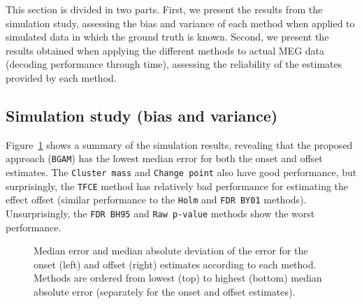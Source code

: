 \documentclass[
  doc,
  floatsintext,
  longtable,
  a4paper,
  nolmodern,
  notxfonts,
  notimes,
  donotrepeattitle,
  colorlinks=true,linkcolor=blue,citecolor=blue,urlcolor=blue]{apa7}
\begin{document}
This section is divided in two parts. First, we present the results from
the simulation study, assessing the bias and variance of each method
when applied to simulated data in which the ground truth is known.
Second, we present the results obtained when applying the different
methods to actual MEG data (decoding performance through time),
assessing the reliability of the estimates provided by each method.

\subsection{Simulation study (bias and
variance)}\label{simulation-study-bias-and-variance}

Figure~\ref{fig-simulation-results} shows a summary of the simulation
results, revealing that the proposed approach (\texttt{BGAM}) has the
lowest median error for both the onset and offset estimates. The
\texttt{Cluster\ mass} and \texttt{Change\ point} also have good
performance, but surprisingly, the \texttt{TFCE} method has relatively
bad performance for estimating the effect offset (similar performance to
the \texttt{Holm} and \texttt{FDR\ BY01} methods). Unsurprisingly, the
\texttt{FDR\ BH95} and \texttt{Raw\ p-value} methods show the worst
performance.

\begin{figure}[!htb]

\caption{\label{fig-simulation-results}Median error and median absolute
deviation of the error for the onset (left) and offset (right) estimates
according to each method. Methods are ordered from lowest (top) to
highest (bottom) median absolute error (separately for the onset and
offset estimates).}


\end{figure}%
\end{document}

